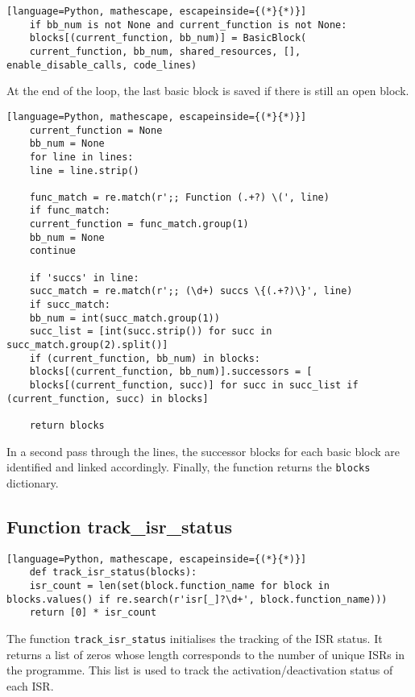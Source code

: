 \documentclass[
fancyheadings, %
%
%
]{stsreprt}
\begin{document}
{\begin{lstlisting}[language=Python, mathescape, escapeinside={(*}{*)}]
	if bb_num is not None and current_function is not None:
	blocks[(current_function, bb_num)] = BasicBlock(
	current_function, bb_num, shared_resources, [], enable_disable_calls, code_lines)
\end{lstlisting}

At the end of the loop, the last basic block is saved if there is still an open block.

\begin{lstlisting}[language=Python, mathescape, escapeinside={(*}{*)}]
	current_function = None
	bb_num = None
	for line in lines:
	line = line.strip()
	
	func_match = re.match(r';; Function (.+?) \(', line)
	if func_match:
	current_function = func_match.group(1)
	bb_num = None
	continue
	
	if 'succs' in line:
	succ_match = re.match(r';; (\d+) succs \{(.+?)\}', line)
	if succ_match:
	bb_num = int(succ_match.group(1))
	succ_list = [int(succ.strip()) for succ in succ_match.group(2).split()]
	if (current_function, bb_num) in blocks:
	blocks[(current_function, bb_num)].successors = [
	blocks[(current_function, succ)] for succ in succ_list if (current_function, succ) in blocks]
	
	return blocks
\end{lstlisting}

In a second pass through the lines, the successor blocks for each basic block are identified and linked accordingly. Finally, the function returns the \texttt{blocks} dictionary.

\subsection*{Function track\_isr\_status}

\begin{lstlisting}[language=Python, mathescape, escapeinside={(*}{*)}]
	def track_isr_status(blocks):
	isr_count = len(set(block.function_name for block in blocks.values() if re.search(r'isr[_]?\d+', block.function_name)))
	return [0] * isr_count  
\end{lstlisting}

The function \texttt{track\_isr\_status} initialises the tracking of the ISR status. It returns a list of zeros whose length corresponds to the number of unique ISRs in the programme. This list is used to track the activation/deactivation status of each ISR.

}
\end{document}
